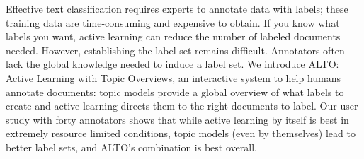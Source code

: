 Effective text classification requires experts to annotate data with labels; these training data are time-consuming and expensive to obtain. If you know what labels you want, active learning can reduce the number of labeled documents needed.  However, establishing the label set remains difficult. Annotators often lack the global knowledge needed to induce a label set.  We introduce ALTO: Active Learning with Topic Overviews, an interactive system to help humans annotate documents: topic models provide a global overview of what labels to create and active learning directs them to the right documents to label.  Our user study with forty annotators shows that while active learning by itself is best in extremely resource limited conditions, topic models (even by themselves) lead to better label sets, and ALTO's combination is best overall.
